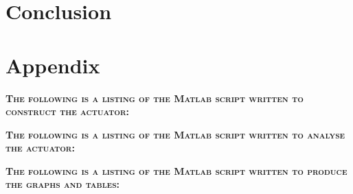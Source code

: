 \documentclass[a4paper]{IEEEtran}
\begin{document}
\section{Conclusion}


\pagebreak
\onecolumn
\section{Appendix}
\textsc{\textbf{The following is a listing of the Matlab script written to construct the actuator:}}


\pagebreak
\textsc{\textbf{The following is a listing of the Matlab script written to analyse the actuator:}}

 
\pagebreak
\textsc{\textbf{The following is a listing of the Matlab script written to produce the graphs and tables:}}

\end{document}
